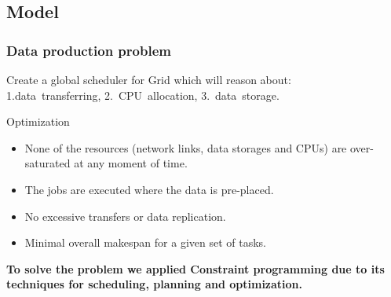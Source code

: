 \documentclass{beamer}
\begin{document}
\subsection{Model}
\begin{frame}\frametitle{Data production problem}
 		\begin{block}{}
Create a global scheduler for Grid which will reason about:\\
\hspace{1cm} 1.data~transferring, \hspace{1cm} 2.~CPU~allocation,\hspace{1cm} 3.~data~storage.  
\end{block}
\begin{block}{Optimization}  
		\begin{itemize}
			\item None of the resources (network links, data storages and CPUs) are over-saturated at any moment of time.
			\item The jobs are executed  where the data is pre-placed.
			\item No excessive transfers or data replication.
			\item Minimal overall makespan for a given set of tasks.
		\end{itemize}
 	\end{block}
\begin{block}{}
\textbf{To solve the problem we applied Constraint programming due to its techniques for scheduling, planning and optimization.}
 	\end{block} 	
\end{frame}
\end{document}
